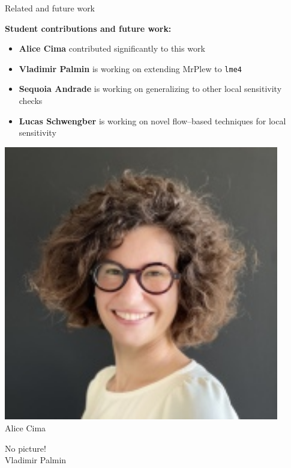 \begin{frame}{Related and future work}

\textbf{Student contributions and future work:}

\begin{itemize}
\item \textbf{Alice Cima} contributed significantly to this work
\item \textbf{Vladimir Palmin} is working on extending MrPlew to \texttt{lme4}
\item \textbf{Sequoia Andrade} is working on generalizing to other local sensitivity checks
\item \textbf{Lucas Schwengber} is working on novel flow--based techniques for local sensitivity
\end{itemize}


\begin{minipage}[t]{0.24\textwidth}
    \centering
    \includegraphics[width=0.9\textwidth]{static_figures/alice.jpg}\\
    Alice Cima
\end{minipage}
\begin{minipage}[t]{0.24\textwidth}
    \centering
    No picture!\\
    Vladimir Palmin
\end{minipage}
\begin{minipage}[t]{0.24\textwidth}
    \centering

\end{minipage}
\end{frame}
